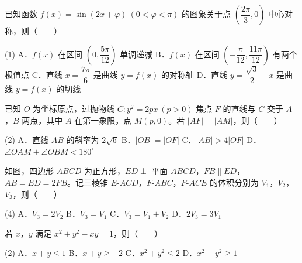 \begin{question}
已知函数 $f(x)=\sin(2x+\varphi)\ (0<\varphi<\pi)$ 的图象关于点 $\left(\dfrac{2\pi}3,0\right)$ 中心对称，则\mbox{（　　）}

\begin{gkopts}(1)
\task A．$f(x)$ 在区间 $\left(0,\dfrac{5\pi}{12}\right)$ 单调递减
\task B．$f(x)$ 在区间 $\left(-\dfrac\pi{12},\dfrac{11\pi}{12}\right)$ 有两个极值点
\task C．直线 $x=\dfrac{7\pi}6$ 是曲线 $y=f(x)$ 的对称轴
\task D．直线 $y=\dfrac{\sqrt3}2-x$ 是曲线 $y=f(x)$ 的切线
\end{gkopts}

\end{question}
\begin{question}
已知 $O$ 为坐标原点，过抛物线 $C:y^{2}=2px\ (p>0)$ 焦点 $F$ 的直线与 $C$ 交于 $A$，$B$ 两点，其中 $A$ 在第一象限，点 $M(p,0)$。若 $|AF|=|AM|$，则\mbox{（　　）}

\begin{gkopts}(2)
\task A．直线 $AB$ 的斜率为 $2\sqrt6$
\task B．$|OB|=|OF|$
\task C．$|AB|>4|OF|$
\task D．$\angle OAM+\angle OBM<180^\circ$
\end{gkopts}

\Needspace{0.4\textheight}
\end{question}
\begin{question}
如图，四边形 $ABCD$ 为正方形，$ED\perp$ 平面 $ABCD$，$FB\parallel ED$，$AB=ED=2FB$。记三棱锥 $E\text{-}ACD$，$F\text{-}ABC$，$F\text{-}ACE$ 的体积分别为 $V_1$，$V_2$，$V_3$，则\mbox{（　　）}
\nopagebreak[4]
\begin{center}\end{center}
\nopagebreak[4]
\begin{gkopts}(4)
\task A．$V_3=2V_2$
\task B．$V_3=V_1$
\task C．$V_3=V_1+V_2$
\task D．$2V_3=3V_1$
\end{gkopts}

\end{question}
\begin{question}
若 $x$，$y$ 满足 $x^{2}+y^{2}-xy=1$，则\mbox{（　　）}

\begin{gkopts}(2)
\task A．$x+y\le1$
\task B．$x+y\ge-2$
\task C．$x^{2}+y^{2}\le2$
\task D．$x^{2}+y^{2}\ge1$
\end{gkopts}

\par\medskip

\end{question}

